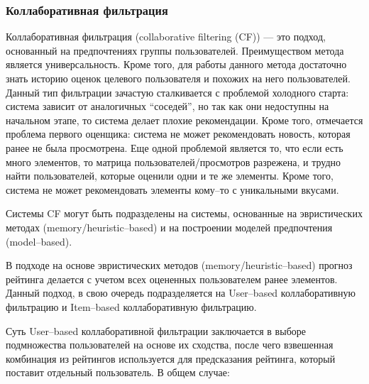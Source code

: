 \subsubsection{Коллаборативная фильтрация}
Коллаборативная фильтрация (collaborative filtering (CF)) --- это подход, основанный на предпочтениях группы пользователей. Преимуществом метода является универсальность. Кроме того, для работы данного метода достаточно знать историю оценок целевого пользователя и похожих на него пользователей. Данный тип фильтрации зачастую сталкивается с проблемой холодного старта: система зависит от аналогичных “соседей”, но так как они недоступны на начальном этапе, то система делает плохие рекомендации. Кроме того, отмечается проблема первого оценщика: система не может рекомендовать новость, которая ранее не была просмотрена. Еще одной проблемой является то, что если есть много элементов, то матрица пользователей/просмотров разрежена, и трудно найти пользователей, которые оценили одни и те же элементы. Кроме того, система не может рекомендовать элементы кому–то с уникальными вкусами. \cite{RecSysImpl}

Системы CF могут быть подразделены на системы, основанные на эвристических методах (memory/heuristic–based) и на построении моделей предпочтения (model–based).

В подходе на основе эвристических методов (memory/heuristic–based) прогноз рейтинга делается с учетом всех оцененных пользователем ранее элементов. Данный подход, в свою очередь подразделяется на User–based коллаборативную фильтрацию и Item–based коллаборативную фильтрацию.

Суть User–based коллаборативной фильтрации заключается в выборе подмножества пользователей на основе их сходства, после чего взвешенная комбинация из рейтингов используется для предсказания рейтинга, который поставит отдельный пользователь. В общем случае:

